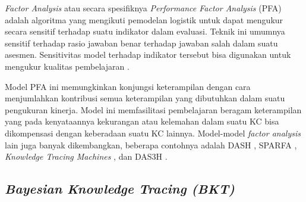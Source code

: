 \textit{Factor Analysis} atau secara spesifiknya \textit{Performance Factor Analysis} (PFA) adalah algoritma yang mengikuti pemodelan logistik untuk dapat mengukur secara sensitif terhadap suatu indikator dalam evaluasi. Teknik ini umumnya sensitif terhadap rasio jawaban benar terhadap jawaban salah dalam suatu asesmen. Sensitivitas model terhadap indikator tersebut bisa digunakan untuk mengukur kualitas pembelajaran \autocite{Ihichr2024}.

Model PFA ini memungkinkan konjungsi keterampilan dengan cara menjumlahkan kontribusi semua keterampilan yang dibutuhkan dalam suatu pengukuran kinerja. Model ini memfasilitasi pembelajaran beragam keterampilan yang pada kenyataannya kekurangan atau kelemahan dalam suatu KC bisa dikompensasi dengan keberadaan suatu KC lainnya. Model-model \textit{factor analysis} lain juga banyak dikembangkan, beberapa contohnya adalah DASH \autocite{Lindsey2014}, SPARFA \autocite{Lan2013}, \textit{Knowledge Tracing Machines} \autocite{Vie2018}, dan DAS3H \autocite{Choffin2019}.

\subsection{\textit{Bayesian Knowledge Tracing (BKT)}}


